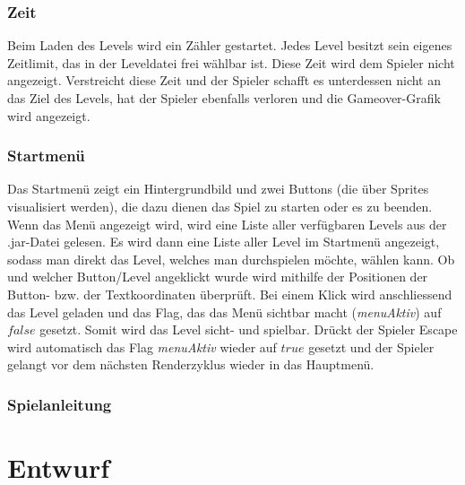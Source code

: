 \documentclass[12pt,a4paper]{scrartcl}
\newcommand{\inmilestonetwo}{\vspace{0.75cm} \framebox[1.1\width]{
\begin{large}
\textcolor{red}{Die Dokumentation dieses Abschnittes ist für Milestone II vorgesehen.}
\end{large}}}
\begin{document}
\subsubsection{Zeit}
Beim Laden des Levels wird ein Zähler gestartet. Jedes Level besitzt sein eigenes Zeitlimit, das in der Leveldatei frei wählbar ist.
Diese Zeit wird dem Spieler nicht angezeigt. Verstreicht diese Zeit und der Spieler schafft es unterdessen nicht an das Ziel des Levels,
hat der Spieler ebenfalls verloren und die Gameover-Grafik wird angezeigt.

\subsubsection{Startmenü}
Das Startmenü zeigt ein Hintergrundbild und zwei Buttons (die über Sprites visualisiert werden), die dazu dienen das Spiel zu starten oder es zu beenden.
Wenn das Menü angezeigt wird, wird eine Liste aller verfügbaren Levels aus der .jar-Datei gelesen. Es wird dann eine
Liste aller Level im Startmenü angezeigt, sodass man direkt das Level, welches man durchspielen möchte, wählen kann.
Ob und welcher Button/Level angeklickt wurde wird mithilfe der Positionen der Button- bzw. der Textkoordinaten überprüft.
Bei einem Klick wird anschliessend das Level geladen und das Flag, das das Menü sichtbar macht (\textit{menuAktiv}) auf $false$
gesetzt. Somit wird das Level sicht- und spielbar. Drückt der Spieler Escape wird automatisch das Flag \textit{menuAktiv} wieder auf $true$
gesetzt und der Spieler gelangt vor dem nächsten Renderzyklus wieder in das Hauptmenü.

\subsubsection{Spielanleitung}
\inmilestonetwo

\clearpage
\newpage
\section{Entwurf}
\end{document}
